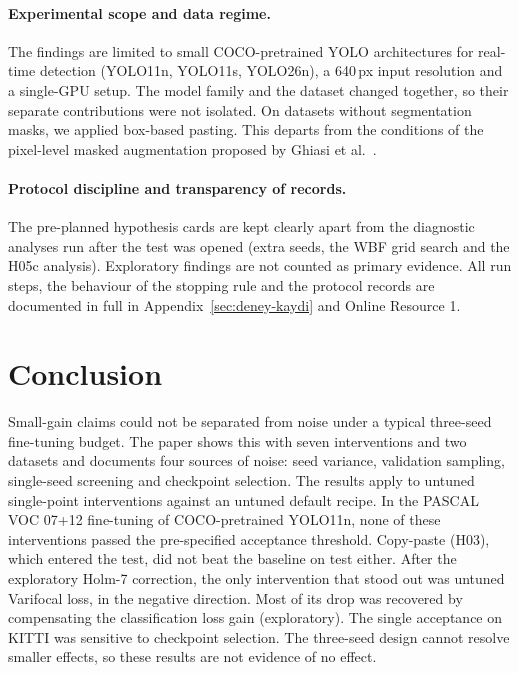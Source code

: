 \documentclass[pdflatex,iicol,sn-mathphys-num]{sn-jnl}
\begin{document}
\paragraph{Experimental scope and data regime.}
The findings are limited to small COCO-pretrained YOLO architectures for real-time detection (YOLO11n, YOLO11s, YOLO26n), a 640\,px input resolution and a single-GPU setup. The model family and the dataset changed together, so their separate contributions were not isolated. On datasets without segmentation masks, we applied box-based pasting. This departs from the conditions of the pixel-level masked augmentation proposed by Ghiasi et al.\ \cite{ghiasi_2021_copypaste}.

\paragraph{Protocol discipline and transparency of records.}
The pre-planned hypothesis cards are kept clearly apart from the diagnostic analyses run after the test was opened (extra seeds, the WBF grid search and the H05c analysis). Exploratory findings are not counted as primary evidence. All run steps, the behaviour of the stopping rule and the protocol records are documented in full in Appendix~\ref{sec:deney-kaydi} and Online Resource 1.

\section{Conclusion}\label{sec:sonuc}

Small-gain claims could not be separated from noise under a typical three-seed fine-tuning budget. The paper shows this with seven interventions and two datasets and documents four sources of noise: seed variance, validation sampling, single-seed screening and checkpoint selection. The results apply to untuned single-point interventions against an untuned default recipe. In the PASCAL VOC 07+12 fine-tuning of COCO-pretrained YOLO11n, none of these interventions passed the pre-specified acceptance threshold. Copy-paste (H03), which entered the test, did not beat the baseline on test either. After the exploratory Holm-7 correction, the only intervention that stood out was untuned Varifocal loss, in the negative direction. Most of its drop was recovered by compensating the classification loss gain (exploratory). The single acceptance on KITTI was sensitive to checkpoint selection. The three-seed design cannot resolve smaller effects, so these results are not evidence of no effect.
\end{document}

